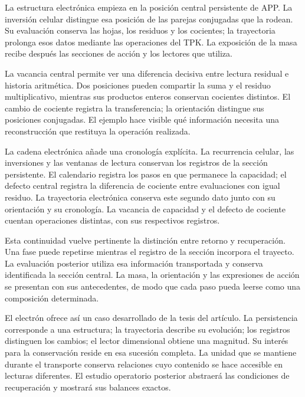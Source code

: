 
La estructura electrónica empieza en la posición central persistente
de APP. La inversión celular distingue esa posición de las parejas
conjugadas que la rodean. Su evaluación conserva las hojas, los
residuos y los cocientes; la trayectoria prolonga esos datos mediante
las operaciones del TPK. La exposición de la masa recibe después las
secciones de acción y los lectores que utiliza.

La vacancia central permite ver una diferencia decisiva entre lectura
residual e historia aritmética. Dos posiciones pueden compartir la
suma y el residuo multiplicativo, mientras sus productos enteros
conservan cocientes distintos. El cambio de cociente registra la
transferencia; la orientación distingue sus posiciones conjugadas.
El ejemplo hace visible qué información necesita una reconstrucción
que restituya la operación realizada.

La cadena electrónica añade una cronología explícita. La recurrencia
celular, las inversiones y las ventanas de lectura conservan los
registros de la sección persistente. El calendario registra los pasos
en que permanece la capacidad; el defecto central registra la diferencia
de cociente entre evaluaciones con igual residuo. La trayectoria
electrónica conserva este segundo dato junto con su orientación y su
cronología. La vacancia de capacidad y el defecto de cociente cuentan
operaciones distintas, con sus respectivos registros.

Esta continuidad vuelve pertinente la distinción entre retorno y
recuperación. Una fase puede repetirse mientras el registro de la
sección incorpora el trayecto. La evaluación posterior utiliza esa
información transportada y conserva identificada la sección central.
La masa, la orientación y las expresiones de acción se presentan con
sus antecedentes, de modo que cada paso pueda leerse como una
composición determinada.

El electrón ofrece así un caso desarrollado de la tesis del artículo.
La persistencia corresponde a una estructura; la trayectoria describe
su evolución; los registros distinguen los cambios; el lector
dimensional obtiene una magnitud. Su interés para la conservación
reside en esa sucesión completa. La unidad que se mantiene durante
el transporte conserva relaciones cuyo contenido se hace accesible
en lecturas diferentes. El estudio operatorio posterior abstraerá
las condiciones de recuperación y mostrará sus balances exactos.
